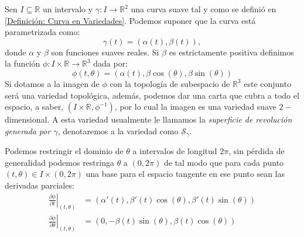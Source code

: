 \begin{example}\label{Ejemplo: Métrica - Superficies de Revolución}
	Sen $I \subseteq \mathbb{R}$ un intervalo y $\gamma: I \to \mathbb{R}^{2}$ una curva suave tal y como se definió en \ref{Definición: Curva en Variedades}. Podemos suponer que la curva está parametrizada como:
	\[
		\gamma(t) = (\alpha(t), \beta(t)),
	\]
	donde $\alpha$ y $\beta$ son funciones suaves reales. Si $\beta$ es estrictamente positiva definimos la función $\phi: I \times \mathbb{R} \to \mathbb{R}^{3}$ dada por:
	\[
		\phi(t,\theta) = (\alpha(t),\beta \cos(\theta), \beta\sin(\theta))
	\]
	Si dotamos a la imagen de $\phi$ con la topología de subespacio de $\mathbb{R}^{3}$ este conjunto será una variedad topológica, además, podemos dar una carta que cubra a todo el espacio, a saber, $(I \times \mathbb{R}, \phi^{-1})$, por lo cual la imagen es una variedad suave $2-$dimensional. A esta variedad usualmente le llamamos la \textit{superficie de revolución generada por $\gamma$}, denotaremos a la variedad como $\mathcal{S}_{\gamma}$.

	Podemos restringir el dominio de $\theta$ a intervalos de longitud $2\pi$, sin pérdida de generalidad podemos restringa $\theta$ a $(0,2\pi)$ de tal modo que para cada punto $(t,\theta) \in I \times (0,2\pi)$ una base para el espacio tangente en ese punto sean las derivadas parciales:
	\begin{align*}
		\left. \frac{\partial \phi}{\partial t} \right|_{(t,\theta)}
		 & =
		(\alpha'(t), \beta'(t) \cos(\theta), \beta'(t)\sin(\theta)) \\
		\left. \frac{\partial \phi}{\partial \theta} \right|_{(t,\theta)}
		 & =
		(0 , -\beta(t) \sin(\theta), \beta(t)\cos(\theta))
	\end{align*}


\end{example}
